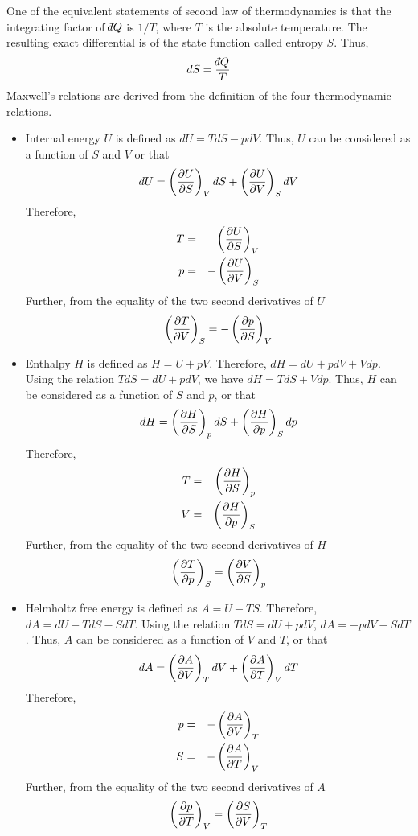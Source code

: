 One of the equivalent statements of second law of thermodynamics is that the integrating factor of $\dbar Q$ is $1/T$, where $T$ is the absolute temperature. The resulting exact 
differential is of the state function called entropy $S$. Thus,
\[
dS = \frac{\dbar Q}{T}
\]
Maxwell's relations are derived from the definition of the four thermodynamic relations.
\begin{itemize}
\item Internal energy $U$ is defined as $dU = TdS - pdV$. Thus, $U$ can be considered as a function of $S$ and $V$ or that
\[
dU = \left(\frac{\partial{U}}{\partial{S}}\right)_V dS + \left(\frac{\partial{U}}{\partial{V}}\right)_S dV
\]
Therefore,
\begin{eqnarray}
T &=& \left(\frac{\partial{U}}{\partial{S}}\right)_V \label{c1s5e1} \\
p &=& -\left(\frac{\partial{U}}{\partial{V}}\right)_S \label{c1s5e2} 
\end{eqnarray}
Further, from the equality of the two second derivatives of $U$ 
\begin{equation}\label{c1s5e3}
\left(\frac{\partial{T}}{\partial{V}}\right)_S = -\left(\frac{\partial{p}}{\partial{S}}\right)_V
\end{equation}

\item Enthalpy $H$ is defined as $H = U + pV$. Therefore, $dH = dU + pdV + Vdp$. Using the relation $TdS = dU + pdV$, we have $dH = TdS + Vdp$. Thus, $H$ can be considered as a 
function of $S$ and $p$, or that
\[
dH = \left(\frac{\partial{H}}{\partial{S}}\right)_p dS + \left(\frac{\partial{H}}{\partial{p}}\right)_S dp
\]
Therefore,
\begin{eqnarray}
T &=& \left(\frac{\partial{H}}{\partial{S}}\right)_p \label{c1s5e4} \\
V &=& \left(\frac{\partial{H}}{\partial{p}}\right)_S \label{c1s5e5} 
\end{eqnarray}
Further, from the equality of the two second derivatives of $H$ 
\begin{equation}\label{c1s5e6}
\left(\frac{\partial{T}}{\partial{p}}\right)_S = \left(\frac{\partial{V}}{\partial{S}}\right)_p
\end{equation}

\item Helmholtz free energy is defined as $A = U - TS$. Therefore, $dA = dU - TdS - SdT$. Using the relation $TdS = dU + pdV$, $dA = -pdV - SdT$. Thus, $A$ can be considered as a function 
of $V$ and $T$, or that
\[
dA = \left(\frac{\partial{A}}{\partial{V}}\right)_T dV + \left(\frac{\partial{A}}{\partial{T}}\right)_V dT
\]
Therefore,
\begin{eqnarray}
p &=& -\left(\frac{\partial{A}}{\partial{V}}\right)_T \label{c1s5e7} \\
S &=& -\left(\frac{\partial{A}}{\partial{T}}\right)_V \label{c1s5e8} 
\end{eqnarray}
Further, from the equality of the two second derivatives of $A$ 
\begin{equation}\label{c1s5e9}
\left(\frac{\partial{p}}{\partial{T}}\right)_V = \left(\frac{\partial{S}}{\partial{V}}\right)_T
\end{equation}


\end{itemize}
